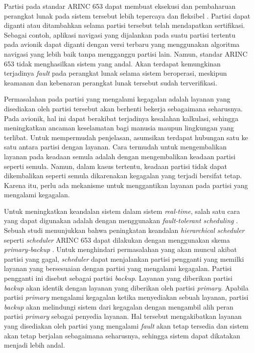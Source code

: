 Partisi pada standar ARINC 653 dapat membuat eksekusi dan pembaharuan perangkat lunak pada
sistem tersebut lebih tepercaya dan fleksibel \citep{Jin2013}.  Partisi dapat diganti atau
ditambahkan selama partisi tersebut telah mendapatkan sertifikasi. Sebagai contoh, aplikasi
navigasi yang dijalankan pada suatu partisi tertentu pada avionik dapat diganti dengan versi
terbaru yang menggunakan algoritma navigasi yang lebih baik tanpa mengganggu partisi lain.
Namun, standar ARINC 653 tidak menghasilkan sistem yang andal. Akan terdapat kemungkinan
terjadinya \textit{fault} pada perangkat lunak selama sistem beroperasi, meskipun keamanan dan
kebenaran perangkat lunak tersebut sudah terverifikasi. 

Permasalahan pada partisi yang mengalami kegagalan adalah layanan yang disediakan oleh partisi
tersebut akan berhenti bekerja sebagaimana seharusnya. Pada avionik, hal ini dapat berakibat
terjadinya kesalahan kalkulasi, sehingga meningkatkan ancaman keselamatan bagi manusia maupun
lingkungan yang terlibat. Untuk mempermudah penjelasan, asumsikan terdapat hubungan satu ke satu
antara partisi dengan layanan. Cara termudah untuk mengembalikan layanan pada keadaan semula
adalah dengan mengembalikan keadaan partisi seperti semula. Namun, dalam kasus tertentu, keadaan
partisi tidak dapat dikembalikan seperti semula dikarenakan kegagalan yang terjadi bersifat
tetap. Karena itu, perlu ada mekanisme untuk menggantikan layanan pada partisi yang mengalami
kegagalan.

Untuk meningkatkan keandalan sistem dalam sistem \textit{real-time}, salah satu cara yang dapat
digunakan adalah dengan menggunakan \textit{fault-tolerant scheduling} \citep{Campbell1986}
\citep{Han2003} \citep{Shin2008}. Sebuah studi menunjukkan bahwa peningkatan keandalan
\textit{hierarchical scheduler} seperti \textit{scheduler} ARINC 653 dapat dilakukan dengan
menggunakan skema \textit{primary-backup} \citep{Hyun2012}. Untuk menghindari permasalahan yang
akan muncul akibat partisi yang gagal, \textit{scheduler} dapat menjalankan partisi pengganti
yang memilki layanan yang bersesuaian dengan partisi yang mengalami kegagalan. Partisi pengganti
ini disebut sebagai partisi \textit{backup}. Layanan yang diberikan partisi \textit{backup} akan
identik dengan layanan yang diberikan oleh partisi \textit{primary}. Apabila partisi
\textit{primary} mengalami kegagalan ketika menyediakan sebuah layanan, partisi \textit{backup}
akan melindungi sistem dari kegagalan dengan mengambil alih peran partisi \textit{primary}
sebagai penyedia layanan. Hal tersebut mengakibatkan layanan yang disediakan oleh partisi yang
mengalami \textit{fault} akan tetap tersedia dan sistem akan tetap berjalan sebagaimana
seharusnya, sehingga sistem dapat dikatakan menjadi lebih andal.

